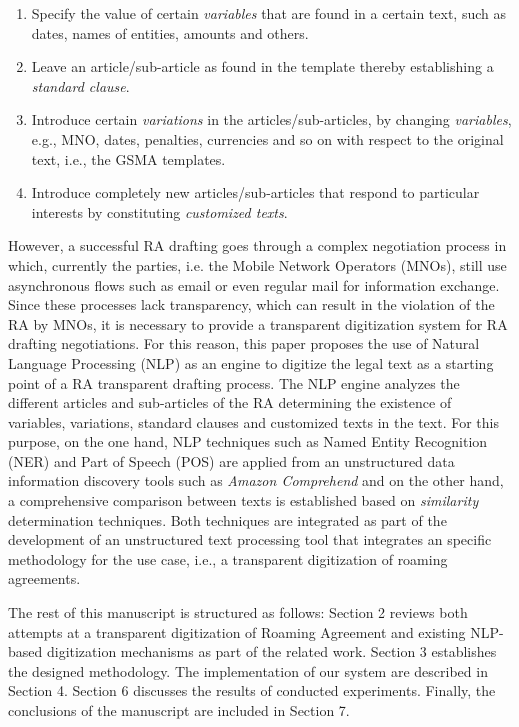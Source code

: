 \documentclass[conference]{style/IEEEtran}
\begin{document}
\begin{enumerate}
\item Specify the value of certain \textit{variables} that are found in a certain text, such as dates, names of entities, amounts and others.

\item Leave an article/sub-article as found in the template thereby establishing a \textit{standard clause}.

\item Introduce certain \textit{variations} in the articles/sub-articles, by changing \textit{variables}, e.g., MNO, dates, penalties, currencies and so on with respect to the original text, i.e., the GSMA templates.

\item Introduce completely new articles/sub-articles that respond to particular interests by constituting \textit{customized texts}.

\end{enumerate}

However, a successful RA drafting goes through a complex negotiation process in which, currently the parties, i.e. the Mobile Network Operators (MNOs), still use asynchronous flows such as email or even regular mail for information exchange. Since these processes lack transparency, which can result in the violation of the RA by MNOs, it is necessary to provide a transparent digitization system for RA drafting negotiations. For this reason, this paper proposes the use of Natural Language Processing (NLP) as an engine to digitize the legal text as a starting point of a RA transparent drafting process. The NLP engine analyzes the different articles and sub-articles of the RA determining the existence of variables, variations, standard clauses and customized texts in the text. For this purpose, on the one hand, NLP techniques such as Named Entity Recognition (NER) and Part of Speech (POS) are applied from an unstructured data information discovery tools such as \textit{Amazon Comprehend} and on the other hand, a comprehensive comparison between texts is established based on \textit{similarity} determination techniques. Both techniques are integrated as part of the development of an unstructured text processing tool that integrates an specific methodology for the use case, i.e., a transparent digitization of roaming agreements.

The rest of this manuscript is structured as follows: Section 2 reviews both attempts at a transparent digitization of Roaming Agreement and existing NLP-based digitization mechanisms as part of the related work. Section 3 establishes the designed methodology. The implementation of our system are described in Section 4. Section 6 discusses the results of conducted experiments. Finally, the conclusions of the manuscript are included in Section 7.
\end{document}
